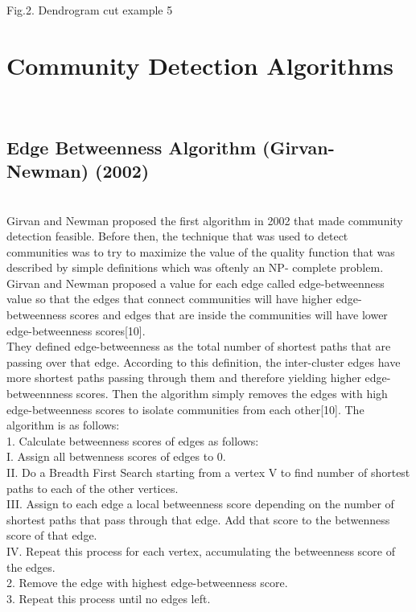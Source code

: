 \documentclass[10pt]{article}
\begin{document}
Fig.2. Dendrogram cut example 5 \\
    
\section{Community Detection Algorithms} \\

\subsection{Edge Betweenness Algorithm (Girvan-Newman) (2002)} \\

Girvan and Newman proposed the first algorithm in 2002 that made community detection feasible. Before then, the technique that was used to detect communities was to try to maximize the value of the quality function that was described by simple definitions which was oftenly an NP- complete problem. \\

Girvan and Newman proposed a value for each edge called edge-betweenness value so that the edges that connect communities will have higher edge-betweenness scores and edges that are inside the communities will have lower edge-betweenness scores[10]. \\

They defined edge-betweenness as the total number of shortest paths that are passing over that edge. According to this definition, the inter-cluster edges have more shortest paths passing through them and therefore yielding higher edge-betweennness scores. Then the algorithm simply removes the edges with high edge-betweenness scores to isolate communities from each other[10]. The algorithm is as follows: \\

1. Calculate betweenness scores of edges as follows: \\
I. Assign all betwenness scores of edges to 0. \\
II. Do a Breadth First Search starting from a vertex V to find number of shortest paths to each of the other vertices. \\
III. Assign to each edge a local betweenness score depending on the number of shortest paths that pass through that edge. Add that score to the betwenness score of that edge. \\
IV. Repeat this process for each vertex, accumulating the betweenness score of the edges. \\
2. Remove the edge with highest edge-betweenness score. \\
3. Repeat this process until no edges left. \\
\end{document}
